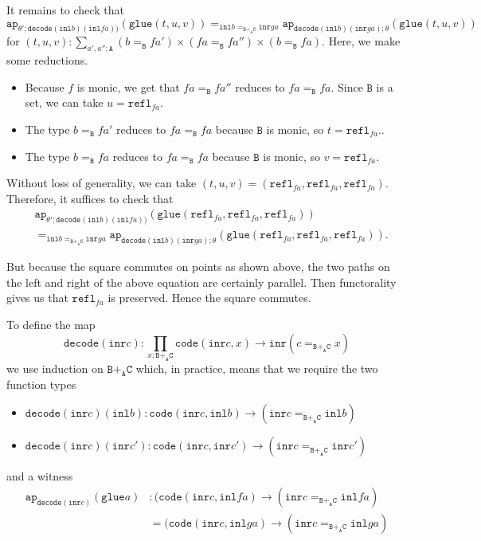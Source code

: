 \documentclass[12pt]{amsart}
\newcommand{\from}{\colon}
\newcommand{\type}[1]{\mathtt{#1}}
\newcommand{\tin}{\colon}
\newcommand{\A}{\type{A}}
\newcommand{\B}{\type{B}}
\newcommand{\C}{\type{C}}
\newcommand{\BAC}{\B +_{\A} \C}
\newcommand{\ap}{\type{ap}}
\newcommand{\inl}{\type{inl}}
\newcommand{\inr}{\type{inr}}
\newcommand{\glue}{\type{glue}}
\newcommand{\refl}{\type{refl}}
\newcommand{\code}{\type{code}}
\newcommand{\decode}{\type{decode}}
\theoremstyle{remark}
\theoremstyle{definition}
\begin{document}
It remains to check that
\[
  \ap_{\theta' ; \decode (\inl b ) ( \inl fa ) )} ( \glue ( t,u,v ) ) 
  =_{ \inl b =_{\BAC} \inr ga }
  \ap_{ \decode ( \inl b )(\inr ga) ; \theta } ( \glue ( t,u,v ) ) 
\]
for
\(
  ( t,u,v ) \tin
  \sum\limits_{a',a''\tin \A}
  ( b =_\B fa' ) \times ( fa =_\B fa'' ) \times ( b =_{\B} fa ).
\)
Here, we make some reductions.
%
\begin{itemize}
\item
  Because \( f \) is monic, we get that
  \(
    fa =_\B fa''
  \)
  reduces to
  \(
    fa =_\B fa.
  \)
  Since \( \B \) is a set, we can take
  \(
    u = \refl_{fa}.
  \)
\item
  The type
  \(
    b =_\B fa'
  \)
  reduces to
  \(
    fa =_\B fa
  \)
  because \( \B \)
  is monic, so
  \(
    t = \refl_{fa}.
  \).
\item
  The type
  \(
    b =_\B fa
  \)
  reduces to
  \(
    fa =_\B fa
  \)
  because \( \B \) is monic, so
  \(
    v = \refl_{fa}.
  \)
\end{itemize}
%
Without loss of generality, we can take
\(
  ( t,u,v ) = ( \refl_{fa},\refl_{fa},\refl_{fa} ).
\)
Therefore, it suffices to check that 
\begin{align*}
%
   & \ap_{\theta' ; \decode (\inl b ) ( \inl fa ) )}
   ( \glue ( \refl_{fa},\refl_{fa},\refl_{fa} ) ) \\
        & =_{ \inl b =_{\BAC} \inr ga }
        \ap_{ \decode ( \inl b )( \inr ga ) ; \theta }
        ( \glue  ( \refl_{fa},\refl_{fa},\refl_{fa} ) ). 
% 
\end{align*}
  
But because the square commutes on points as shown above, the two
paths on the left and right of the above equation are certainly
parallel.  Then functorality gives us that \( \refl_{fa} \) is
preserved. Hence the square commutes.


To define the map
\[
  \decode ( \inr c ) \from
  \prod\limits_{x \tin \BAC}
  \code ( \inr c , x ) \to \inr ( c =_{\BAC} x )
\]
we use induction on \( \BAC \) which, in practice, means that we
require the two function types
%
\begin{itemize}
\item
  \(
    \decode ( \inr c ) ( \inl b ) \from
      \code (\inr c , \inl b) \to
      ( \inr c =_{\BAC} \inl b )
  \)
\item
  \(
    \decode ( \inr c ) ( \inr c' ) \from
      \code ( \inr c , \inr c' ) \to
      ( \inr c =_{\BAC} \inr c' )
  \) 
\end{itemize}
%
and a witness
%
\begin{align*}
  \ap_{\decode ( \inr c ) } (\glue a) & \tin
  ( \code ( \inr c , \inl fa ) \to ( \inr c =_{\BAC} \inl fa ) \\
  & = ( \code ( \inr c , \inl ga ) \to ( \inr c =_{\BAC} \inl ga )
\end{align*}
\end{document}
